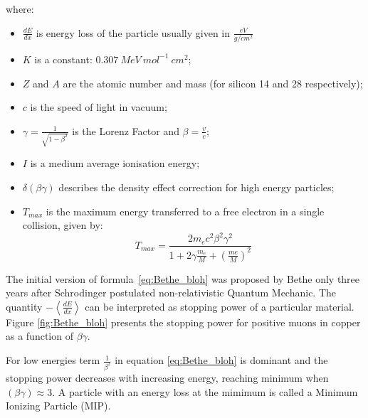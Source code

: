 where: 
\begin{itemize}
    \item $\frac{dE}{dx}$ is energy loss of the particle usually given in $\frac{eV}{g/cm^{2}}$
    \item $K$ is a constant: $0.307~ MeV~ mol^{-1}~ cm^2$;
    \item $Z$ and $A$ are the atomic number and mass (for silicon 14 and 28 respectively);
    \item $c$ is the speed of light in vacuum;
    \item $\gamma = \frac{1}{\sqrt{1-\beta^2}}$ is the Lorenz Factor and $\beta = \frac{v}{c}$;
    \item $I$ is a medium average ionisation energy;
    \item $\delta(\beta \gamma)$ describes the density effect correction for high energy particles; 
    \item $T_{max}$ is the maximum energy transferred to a free electron in a single collision, given by:
    \begin{equation}
        T_{max} = \frac{2m_e c^2 \beta^2 \gamma^2}{1+2\gamma \frac{m_e}{M}+ (\frac{me}{M})^2}
    \end{equation}
\end{itemize}

The initial version of formula~\ref{eq:Bethe_bloh} was proposed by Bethe \cite{Bethe} only three years after Schrodinger postulated non-relativistic Quantum Mechanic. The quantity $-\left< \frac{dE}{dx} \right>$ can be interpreted as stopping power of a particular material. Figure \ref{fig:Bethe_bloh} presents the stopping power for positive muons in copper as a function of $\beta \gamma$. 

For low energies term $\frac{1}{\beta^2}$ in equation \ref{eq:Bethe_bloh} is dominant and the stopping power decreases with increasing energy, reaching minimum when $(\beta \gamma) \approx 3 $. A particle with an energy loss at the mimimum is called a Minimum Ionizing Particle (MIP). 



